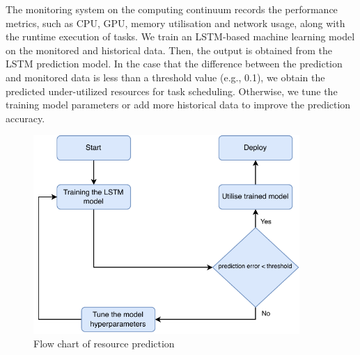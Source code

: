         The monitoring system on the computing continuum records the performance metrics, such as CPU, GPU, memory utilisation and network usage, along with the runtime execution of tasks. We train an LSTM-based machine learning model on the monitored and historical data. Then, the output is obtained from the LSTM prediction model. In the case that the difference between the prediction and monitored data is less than a threshold value (e.g., 0.1), we obtain the predicted under-utilized resources for task scheduling. Otherwise, we tune the training model parameters or add more historical data to improve the prediction accuracy.


        \begin{figure}
            \centering
            \includegraphics[width=0.9\textwidth]{figures/training_flowchart.pdf}
            \caption{Flow chart of resource prediction}
            \label{fig:flow-chart-of-resource-prediction}
        \end{figure}


